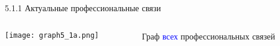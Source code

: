 \begin{frame}{5.1.1 Актуальные профессиональные связи}

\begin{columns}[T] %
\begin{column}{0.8\textwidth} %
\centering
          \texttt{[image: graph5\_1a.png]}
\end{column}
\begin{column}{0.2\textwidth} %

Граф \textcolor{blue}{всех} профессиональных связей

\end{column}
\end{columns}
\end{frame}


